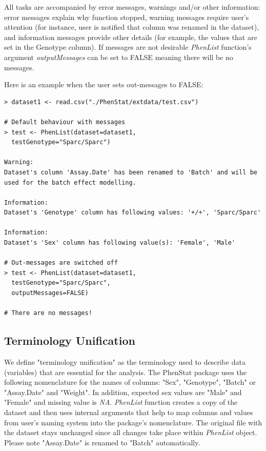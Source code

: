 \documentclass[12pt,a4paper]{article}
\begin{document}
All tasks are accompanied by error messages, warnings and/or other information: error messages explain why function stopped, 
warning messages require user's attention (for instance, user is notified that column was renamed in the dataset), and information messages provide other details (for example, the values that are set in the Genotype column). 
If messages are not desirable \textit{PhenList} function's argument \textit{outputMessages} can be set to FALSE meaning there will be no messages.

Here is an example when the user sets out-messages to FALSE: 

\begingroup
    \fontsize{8pt}{12pt}\selectfont
\begin{verbatim}
> dataset1 <- read.csv("./PhenStat/extdata/test.csv")

# Default behaviour with messages
> test <- PhenList(dataset=dataset1,
  testGenotype="Sparc/Sparc")

Warning:
Dataset's column 'Assay.Date' has been renamed to 'Batch' and will be used for the batch effect modelling.

Information:
Dataset's 'Genotype' column has following values: '+/+', 'Sparc/Sparc'

Information:
Dataset's 'Sex' column has following value(s): 'Female', 'Male'

# Out-messages are switched off 
> test <- PhenList(dataset=dataset1,
  testGenotype="Sparc/Sparc",
  outputMessages=FALSE)
  
# There are no messages!
\end{verbatim}
\endgroup

\subsection{Terminology Unification}
\label{TerminilogyUnification}
We define "terminology unification" as the terminology used to describe data (variables) that are essential for the analysis. The PhenStat package uses the following nomenclature for the names of columns: "Sex", "Genotype", "Batch" or "Assay.Date" and "Weight". In addition, expected sex values are "Male" and "Female" and missing value is \textit{NA}. 
\textit{PhenList} function creates a copy of the dataset and then uses internal arguments that help to map columns and values from user's naming system into the package's nomenclature. 
The original file with the dataset stays unchanged since all changes take place within \textit{PhenList} object. Please note "Assay.Date" is renamed to "Batch" automatically.
\end{document}
